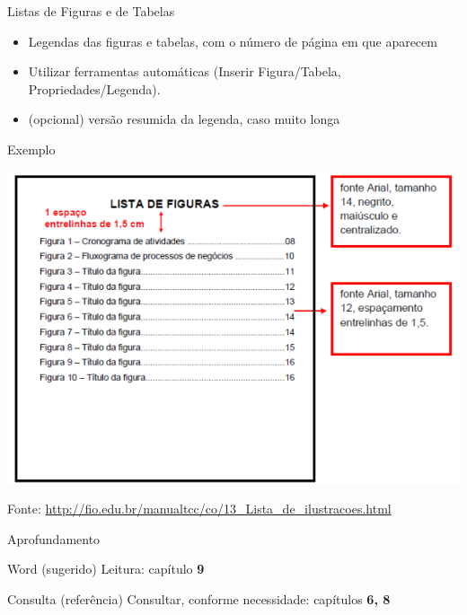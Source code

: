 \documentclass{beamer}
\begin{document}
\begin{frame}{Listas de Figuras e de Tabelas}
  \begin{itemize}
  \item Legendas das figuras e tabelas, com o número de página em que
    aparecem
  \item Utilizar ferramentas automáticas (Inserir Figura/Tabela,
    Propriedades/Legenda).
  \item (opcional) versão resumida da legenda, caso muito longa
  \end{itemize}
\end{frame}

\begin{frame}{Exemplo}
  \begin{center}
    \includegraphics[height=0.8\textheight]{ProjetoII/lista_figuras}
  \end{center}

  Fonte: \url{http://fio.edu.br/manualtcc/co/13_Lista_de_ilustracoes.html}
\end{frame}

\begin{frame}{Aprofundamento}
  \begin{block}{Word (sugerido)}
    Leitura: capítulo {\bf 9}
  \end{block}
  \begin{block}{Consulta (referência)}
    Consultar, conforme necessidade: capítulos {\bf 6, 8}
  \end{block}
\end{frame}


\end{document}
